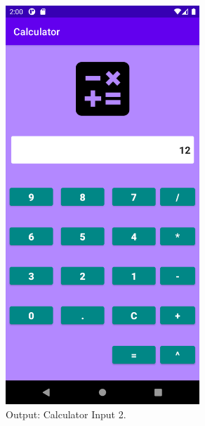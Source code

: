 \documentclass[12pt, a4]{article}
\begin{document}
\subsection*{}
\begin{figure}[h]
\centering
\caption{Output: Calculator Input 2.}
\includegraphics[height=15cm, width=7.3cm]{Calculator/Screenshots/Calculator-2.png}
\end{figure}

\newpage
\end{document}
